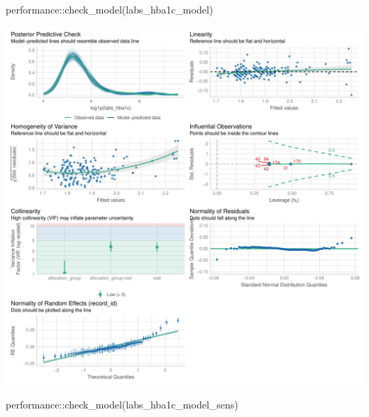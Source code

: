 \documentclass[
  letterpaper,
  DIV=11,
  numbers=noendperiod]{scrartcl}
\newenvironment{Shaded}{\begin{snugshade}}{\end{snugshade}}
\newcommand{\FunctionTok}[1]{\textcolor[rgb]{0.28,0.35,0.67}{#1}}
\newcommand{\NormalTok}[1]{\textcolor[rgb]{0.00,0.23,0.31}{#1}}
\newcommand{\SpecialCharTok}[1]{\textcolor[rgb]{0.37,0.37,0.37}{#1}}
\begin{document}
\begin{Shaded}
\begin{Highlighting}[]
\NormalTok{performance}\SpecialCharTok{::}\FunctionTok{check\_model}\NormalTok{(labs\_hba1c\_model)}
\end{Highlighting}
\end{Shaded}

\includegraphics{Outcomes_V1V2V3_files/figure-pdf/labs_hba1c_4-1.pdf}

\begin{Shaded}
\begin{Highlighting}[]
\NormalTok{performance}\SpecialCharTok{::}\FunctionTok{check\_model}\NormalTok{(labs\_hba1c\_model\_sens)}
\end{Highlighting}
\end{Shaded}
\end{document}
